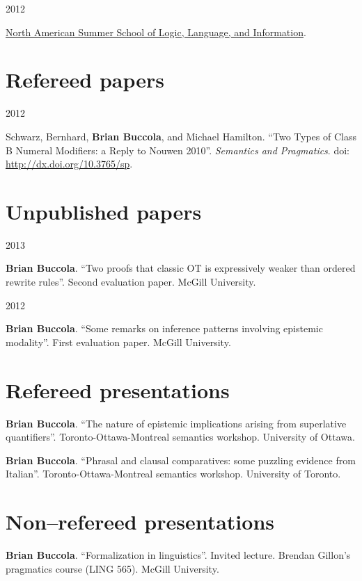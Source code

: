 \documentclass[11pt,letterpaper]{article}
\newcommand{\name}{Brian Buccola}
\newcommand{\cvitem}[2]{%
  \begin{minipage}[t]{0.24\textwidth}
    #1 %
  \end{minipage}
  \hfill
  \begin{minipage}[t]{0.74\textwidth}
    #2 %
  \end{minipage}
}
\begin{document}
\cvitem{2012 \shortmonthname[6]}{\href{http://nasslli2012.com/about}{North
American Summer School of Logic, Language, and Information}.}



\section*{Refereed papers}

\cvitem{2012}{Schwarz, Bernhard, \textbf{\name}, and Michael Hamilton. ``Two
Types of Class B Numeral Modifiers: a Reply to Nouwen 2010''.  \textit{Semantics
and Pragmatics}. doi: \url{http://dx.doi.org/10.3765/sp}.}



\section*{Unpublished papers}

\cvitem{2013}{\textbf{\name}. ``Two proofs that classic OT is expressively
weaker than ordered rewrite rules''. Second evaluation paper. McGill
University.}

\cvitem{2012}{\textbf{\name}. ``Some remarks on inference patterns involving
epistemic modality''. First evaluation paper. McGill University.}



\section*{Refereed presentations}

\cvitem{}{\textbf{\name}. ``The nature of epistemic
implications arising from superlative quantifiers''. Toronto-Ottawa-Montreal
semantics workshop. University of Ottawa.}

\cvitem{}{\textbf{\name}. ``Phrasal and clausal
comparatives: some puzzling evidence from Italian''. Toronto-Ottawa-Montreal
semantics workshop.  University of Toronto.}



\section*{Non--refereed presentations}

\cvitem{}{\textbf{\name}. ``Formalization in
linguistics''. Invited lecture. Brendan Gillon's pragmatics course (LING 565).
McGill University.}
\end{document}
